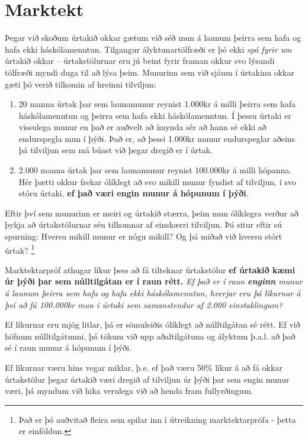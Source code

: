 \documentclass[
]{book}
\begin{document}
\hypertarget{marktekt}{%
\chapter{Marktekt}\label{marktekt}}

Þegar við skoðum úrtakið okkar gætum við séð mun á launum þeirra sem hafa og hafa ekki háskólamenntun. Tilgangur ályktunartölfræði er þó ekki \emph{spá fyrir um} úrtakið okkar -- úrtakstölurnar eru jú beint fyrir framan okkur svo lýsandi tölfræði myndi duga til að lýsa þeim. Munurinn sem við sjáum í úrtakinu okkar gæti þó verið tilkomin af hreinni tilviljun:

\begin{enumerate}
\def\labelenumi{\arabic{enumi}.}
\item
  20 manna úrtak þar sem launamunur reynist 1.000kr á milli þeirra sem hafa háskólamenntun og þeirra sem hafa ekki háskólamenntun. Í þessu úrtaki er vissulega munur en það er auðvelt að ímynda sér að hann sé ekki að endurspegla mun í þýði. Það er, að þessi 1.000kr munur endurspeglar aðeins þá tilviljun sem má búast við þegar dregið er í úrtak.
\item
  2.000 manna úrtak þar sem launamunur reynist 100.000kr á milli hópanna. Hér þætti okkur frekar ólíklegt að svo mikill munur fyndist af tilviljun, í svo stóru úrtaki, \textbf{ef það væri engin munur á hópunum í þýði}.
\end{enumerate}

Eftir því sem munurinn er meiri og úrtakið stærra, þeim mun ólíklegra verður að þykja að úrtakstölurnar séu tilkomnar af einskærri tilviljun. Þá situr eftir sú spurning: Hversu mikill munur er nógu mikill? Og þá miðað við hversu stórt úrtak? \footnote{Það er þó auðvitað fleira sem spilar inn í útreikning marktektarprófa - þetta er einföldun.}

Marktektarpróf athugar líkur þess að fá tilteknar úrtakstölur \textbf{ef úrtakið kæmi úr þýði þar sem núlltilgátan er í raun rétt.} \emph{Ef það er í raun \textbf{enginn} munur á launum þeirra sem hafa og hafa ekki háskólamenntun, hverjar eru þá líkurnar á því að fá 100.000kr mun í úrtaki sem samanstendur af 2.000 einstaklingum?}

Ef líkurnar eru mjög litlar, þá er sömuleiðis ólíklegt að núlltilgátan sé rétt. Ef við höfnum núlltilgátunni, þá tökum við upp aðaltilgátuna og ályktum þ.a.l. að það sé í raun munur á hópunum í þýði.

Ef líkurnar væru hins vegar miklar, þ.e. ef það væru 50\% líkur á að fá okkar úrtakstölur þegar úrtakið væri dregið af tilviljun úr þýði þar sem engin munur væri, þá myndum við hika verulega við að henda fram fullyrðingum.
\end{document}
